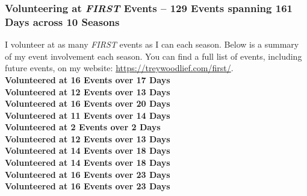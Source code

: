 \subsubsection*{Volunteering at \textit{FIRST} Events -- 129 Events spanning 161 Days across 10 Seasons}
I volunteer at as many \textit{FIRST} events as I can each season. Below is a summary of my event involvement each season.
You can find a full list of events, including future events, on my website: \url{https://treywoodlief.com/first/}.\\ 
 \textbf{Volunteered at 16 Events over 17 Days}\\ 
 \textbf{Volunteered at 12 Events over 13 Days}\\ 
 \textbf{Volunteered at 16 Events over 20 Days}\\ 
 \textbf{Volunteered at 11 Events over 14 Days}\\ 
 \textbf{Volunteered at 2 Events over 2 Days}\\ 
 \textbf{Volunteered at 12 Events over 13 Days}\\ 
 \textbf{Volunteered at 14 Events over 18 Days}\\ 
 \textbf{Volunteered at 14 Events over 18 Days}\\ 
 \textbf{Volunteered at 16 Events over 23 Days}\\ 
 \textbf{Volunteered at 16 Events over 23 Days}\\ 
